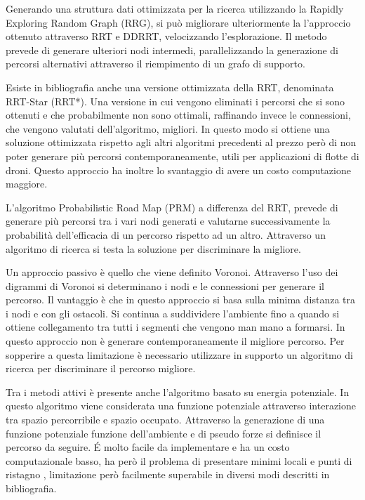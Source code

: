 Generando una struttura dati ottimizzata per la ricerca utilizzando la Rapidly Exploring Random Graph (RRG), si può migliorare ulteriormente la l'approccio ottenuto attraverso RRT e DDRRT, velocizzando l'esplorazione. Il metodo prevede di generare ulteriori nodi intermedi, parallelizzando la generazione di percorsi alternativi attraverso il riempimento di un grafo di supporto.

Esiste in bibliografia anche una versione ottimizzata della RRT, denominata RRT-Star (RRT*). Una versione in cui vengono eliminati i percorsi che si sono ottenuti e che probabilmente non sono ottimali, raffinando invece le connessioni, che vengono valutati dell'algoritmo, migliori. In questo modo si ottiene una soluzione ottimizzata rispetto agli altri algoritmi precedenti al prezzo però di non poter generare più percorsi contemporaneamente, utili per applicazioni di flotte di droni. Questo approccio ha inoltre lo svantaggio di avere un costo computazione  maggiore.

L'algoritmo Probabilistic Road Map (PRM) a differenza del RRT, prevede di generare più percorsi tra i vari nodi generati e valutarne successivamente la probabilità dell'efficacia di un percorso rispetto ad un altro. Attraverso un algoritmo di ricerca si testa la soluzione per discriminare la migliore.

Un approccio passivo è quello che viene definito Voronoi. Attraverso l'uso dei digrammi di Voronoi si determinano i nodi e le connessioni per generare il percorso. Il vantaggio è che in questo approccio si basa sulla minima distanza tra i nodi e con gli ostacoli. Si continua a suddividere l'ambiente fino a quando si ottiene collegamento tra tutti i segmenti che vengono man mano a formarsi. In questo approccio non è generare contemporaneamente il migliore percorso. Per sopperire a questa limitazione è necessario utilizzare in supporto un algoritmo di ricerca per discriminare il percorso migliore.

Tra i metodi attivi è presente anche l'algoritmo basato su energia potenziale. In questo algoritmo viene considerata una funzione potenziale attraverso interazione tra spazio percorribile e spazio occupato. Attraverso la generazione di una funzione potenziale funzione dell'ambiente e di pseudo forze si definisce il percorso da seguire. \'E molto facile da implementare e ha un costo computazionale basso, ha però il problema di presentare minimi locali e punti di ristagno , limitazione però facilmente superabile in diversi modi descritti in bibliografia.

